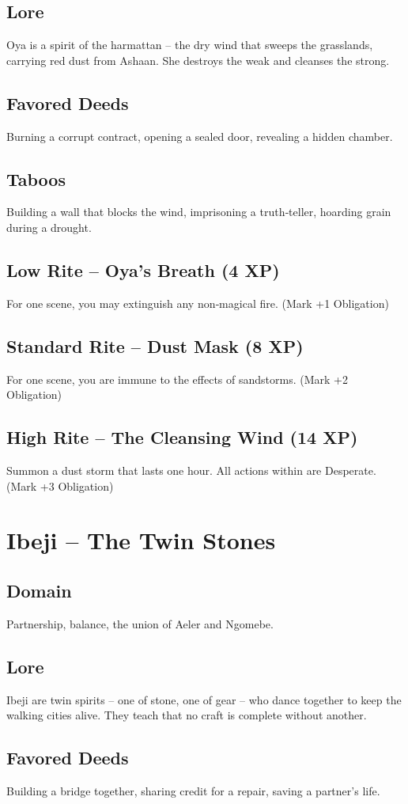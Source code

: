 \documentclass[11pt]{book}
\begin{document}
\subsection*{Lore}
Oya is a spirit of the harmattan -- the dry wind that sweeps the grasslands, carrying red dust from Ashaan. She destroys the weak and cleanses the strong.
\subsection*{Favored Deeds}
Burning a corrupt contract, opening a sealed door, revealing a hidden chamber.
\subsection*{Taboos}
Building a wall that blocks the wind, imprisoning a truth‑teller, hoarding grain during a drought.
\subsection*{Low Rite -- Oya's Breath (4 XP)}
For one scene, you may extinguish any non‑magical fire. (Mark +1 Obligation)
\subsection*{Standard Rite -- Dust Mask (8 XP)}
For one scene, you are immune to the effects of sandstorms. (Mark +2 Obligation)
\subsection*{High Rite -- The Cleansing Wind (14 XP)}
Summon a dust storm that lasts one hour. All actions within are Desperate. (Mark +3 Obligation)

\section{Ibeji -- The Twin Stones}
\subsection*{Domain}
Partnership, balance, the union of Aeler and Ngomebe.
\subsection*{Lore}
Ibeji are twin spirits -- one of stone, one of gear -- who dance together to keep the walking cities alive. They teach that no craft is complete without another.
\subsection*{Favored Deeds}
Building a bridge together, sharing credit for a repair, saving a partner's life.
\end{document}

